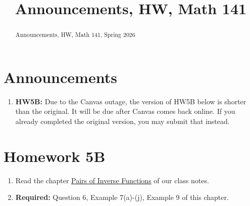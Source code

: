\documentclass{ximera}
\title{Announcements, HW, Math 141}
\begin{document}
\begin{abstract}
Announcements, HW, Math 141, Spring 2026
\end{abstract}
\maketitle


\section{Announcements}
\begin{enumerate}
\item {\bf HW5B:} Due to the Canvas outage, the version of HW5B below is shorter than the original. It will be due after Canvas comes back online. If you already completed the original version, you may submit that instead.
\end{enumerate}


\section{Homework 5B}

\begin{enumerate}
\item Read the chapter \href{https://ximera.osu.edu/precalc1/PreCalculus1/Inverses/Inverses}{Pairs of Inverse Functions} of our class notes. 

\item {\bf Required:} Question 6, Example 7(a)-(j), Example 9 of this chapter.

\end{enumerate}
\end{document}
